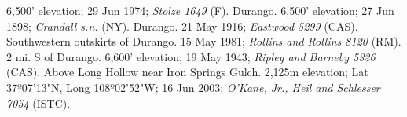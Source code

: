 6,500' elevation; 29 Jun 1974; \textit{Stolze 1649} (F).  Durango. 6,500' elevation; 27 Jun 1898; \textit{Crandall s.n.} (NY).  Durango. 21 May 1916; \textit{Eastwood 5299} (CAS).  Southwestern outskirts of Durango. 15 May 1981; \textit{Rollins and Rollins 8120} (RM).  2 mi. S of Durango. 6,600' elevation; 19 May 1943; \textit{Ripley and Barneby 5326} (CAS).  Above Long Hollow near Iron Springs Gulch. 2,125m elevation; Lat 37º07'13"N, Long 108º02'52"W; 16 Jun 2003; \textit{O'Kane, Jr., Heil and Schlesser 7054} (ISTC).



  







